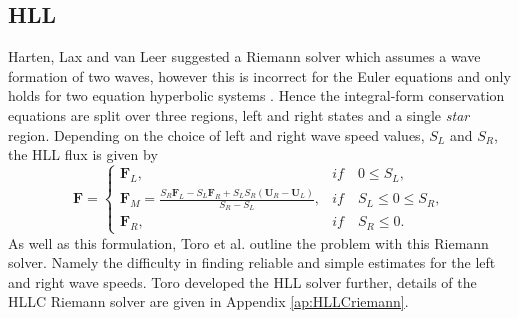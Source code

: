 \subsection{HLL}
\label{sec:HLL}

	Harten, Lax and van Leer \cite{HLL83} suggested a Riemann solver which assumes a wave formation of two waves, however this is incorrect for the Euler equations and only holds for two equation hyperbolic systems \cite{Toro09}. Hence the integral-form conservation equations are split over three regions, left and right states and a single \emph{star} region. Depending on the choice of left and right wave speed values, $S_L$ and $S_R$, the HLL flux is given by
	\begin{equation}
		\mathbf{F}=
		\begin{cases}
			\mathbf{F}_L, & if \quad 0\leq S_L, \\
			\mathbf{F}_M=\frac{S_R\mathbf{F}_L-S_L\mathbf{F}_R+S_LS_R\left(\mathbf{U}_R-\mathbf{U}_L\right)}{S_R-S_L}, & if \quad S_L\leq0\leq S_R,\\
			\mathbf{F}_R, & if \quad S_R\leq0.
		\end{cases}
		\nonumber
	\end{equation}
	As well as this formulation, Toro et al. \cite{Toro94} outline the problem with this Riemann solver. Namely the difficulty in finding reliable and simple estimates for the left and right wave speeds. Toro developed the HLL solver further, details of the HLLC Riemann solver are given in Appendix \ref{ap:HLLCriemann}. 
	
